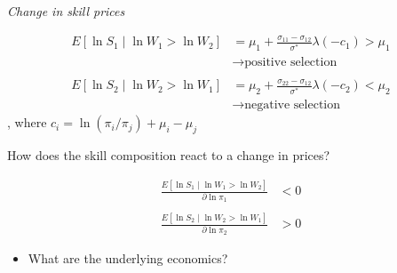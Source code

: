 \begin{frame}\begin{center}
	\LARGE\textit{Change in skill prices}
\end{center}\end{frame}
\begin{frame}
\begin{align*}
E[\ln S_1 \mid \ln W_1 > \ln W_2] & = \mu_1 + \frac{\sigma_{11} - \sigma_{12}}{\sigma^*} \lambda(-c_1) > \mu_1\\
								  & \rightarrow \text{positive selection} \\
								  & \\
E[\ln S_2 \mid \ln W_2 > \ln W_1] & = \mu_2 + \frac{\sigma_{22} - \sigma_{12}}{\sigma^*} \lambda(-c_2) < \mu_2 \\
& \rightarrow \text{negative selection}
\end{align*}
, where $c_i = \ln(\pi_i / \pi_j) + \mu_i - \mu_j$



\end{frame}

\begin{frame}

How does the skill composition react to a change in prices?

\begin{align*}
\frac{E[\ln S_1 \mid \ln W_1 > \ln W_2]}{\partial \ln \pi_1 } & < 0 \\
&\\
\frac{E[\ln S_2 \mid \ln W_2 > \ln W_1]}{\partial \ln \pi_2 } & > 0
\end{align*}

\begin{itemize}
\item What are the underlying economics?
\end{itemize}

\end{frame}
